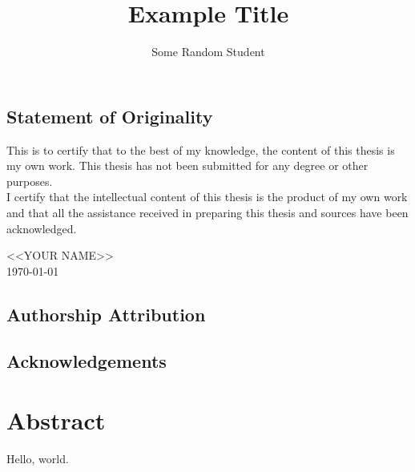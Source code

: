\documentclass[ispdf]{usydthesis}
\title{Example Title}
\author{Some Random Student}
\begin{document}
\pagestyle{empty}
\maketitle

\begin{center}
\section*{Statement of Originality}
\end{center}

This is to certify that to the best of my knowledge, the content of this thesis is my own work. This thesis has not been submitted for any degree or other purposes.\\

\noindent I certify that the intellectual content of this thesis is the product of my own work and that all the assistance received in preparing this thesis and sources have been acknowledged.
\\

\begin{flushright}
\noindent <<YOUR NAME>>\\
\today
\end{flushright}

\newpage
\section*{Authorship Attribution}

%
%

\newpage

\makededication

\section*{\centering Acknowledgements}

\chapter*{Abstract}
\setcounter{page}{5}
Hello, world.
\setcounter{page}{6}
\pagestyle{empty}

\newpage

\begingroup
\hypersetup{linkcolor=black}
\let\cleardoublepage\relax
\let\clearpage\relax
\end{document}
